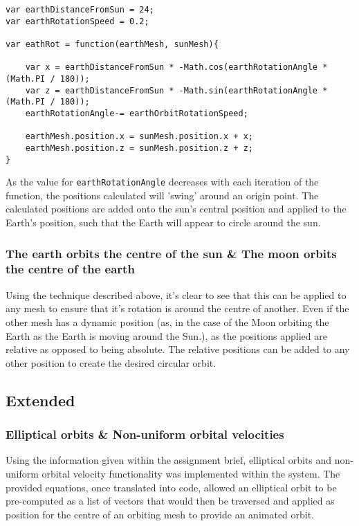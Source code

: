 \documentclass[titlepage]{article}
\begin{document}
\begin{lstlisting}[caption=Simple orbit calculation]
var earthDistanceFromSun = 24;
var earthRotationSpeed = 0.2;

var eathRot = function(earthMesh, sunMesh){
    
    var x = earthDistanceFromSun * -Math.cos(earthRotationAngle * (Math.PI / 180));
    var z = earthDistanceFromSun * -Math.sin(earthRotationAngle * (Math.PI / 180));
    earthRotationAngle-= earthOrbitRotationSpeed;
    
    earthMesh.position.x = sunMesh.position.x + x;
    earthMesh.position.z = sunMesh.position.z + z;
}

\end{lstlisting}

As the value for \texttt{earthRotationAngle} decreases with each iteration of the function, the positions calculated will 'swing' around an origin point. The calculated positions are added onto the sun's central position and applied to the Earth's position, such that the Earth will appear to circle around the sun.

\subsubsection{The earth orbits the centre of the sun \& The moon orbits the centre of the earth}
Using the technique described above, it's clear to see that this can be applied to any mesh to ensure that it's rotation is around the centre of another. Even if the other mesh has a dynamic position (as, in the case of the Moon orbiting the Earth as the Earth is moving around the Sun.), as the positions applied are relative as opposed to being absolute. The relative positions can be added to any other position to create the desired circular orbit.
 

\subsection{Extended}
\subsubsection{Elliptical orbits \& Non-uniform orbital velocities}
Using the information given within the assignment brief, elliptical orbits and non-uniform orbital velocity functionality was implemented within the system. The provided equations, once translated into code, allowed an elliptical orbit to be pre-computed as a list of vectors that would then be traversed and applied as position for the centre of an orbiting mesh to provide an animated orbit.
\end{document}

